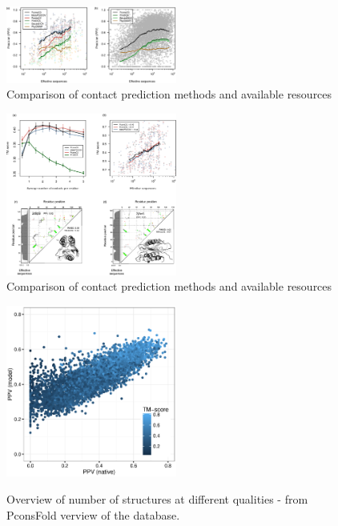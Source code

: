 \documentclass[a4,center,fleqn]{NAR}
\begin{document}
\begin{figure}[t]
\begin{center}
\end{center}
    \includegraphics[width=0.5\textwidth]{figures/fig1_PNAS.eps}
    \caption{Comparison of contact prediction methods and available resources}
\label{fig:comparison}

\end{figure}
\begin{figure}[t]
\begin{center}
\end{center}
    \includegraphics[width=0.5\textwidth]{figures/fig4_PNAS.eps}
    \caption{Comparison of contact prediction methods and available resources}
\label{fig:comparison}
\end{figure}


\begin{figure}[t]
\begin{center}
\end{center}
\caption{Overview of number of structures at different qualities - from PconsFold
verview of the database.}
    \includegraphics[width=0.5\textwidth]{figures/fig_pfam_ppv_native_vs_model.eps}
\label{fig:overview}
\end{figure}
\end{document}
